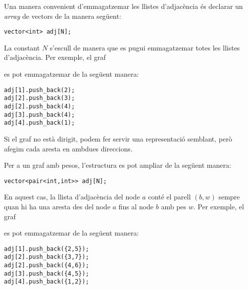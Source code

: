 Una manera convenient d'emmagatzemar les llistes d'adjacència és
declarar un \emph{array} de vectors de la manera següent:
\begin{lstlisting}
vector<int> adj[N];
\end{lstlisting}


La constant $N$ s'escull de manera que es pugui emmagatzemar totes
les llistes d'adjacència. Per exemple, el graf


\begin{center}
\end{center}
es pot emmagatzemar de la següent manera:
\begin{lstlisting}
adj[1].push_back(2);
adj[2].push_back(3);
adj[2].push_back(4);
adj[3].push_back(4);
adj[4].push_back(1);
\end{lstlisting}


Si el graf no està dirigit, podem fer servir una representació
semblant, però afegim cada aresta en ambdues direccions.

Per a un graf amb pesos, l'estructura es pot ampliar de la següent
manera:


\begin{lstlisting}
vector<pair<int,int>> adj[N];
\end{lstlisting}


En aquest cas, la llista d'adjacència del node $a$ conté el parell
$(b,w)$ sempre quan hi ha una aresta des del node $a$ fins al node $b$
amb pes $w$. Per exemple, el graf


\begin{center}
\end{center}
es pot emmagatzemar de la següent manera:
\begin{lstlisting}
adj[1].push_back({2,5});
adj[2].push_back({3,7});
adj[2].push_back({4,6});
adj[3].push_back({4,5});
adj[4].push_back({1,2});
\end{lstlisting}


